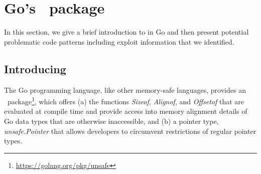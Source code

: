 \section{Go's \unsafe{}~package}
\label{sec:background}

In this section, we give a brief introduction to \unsafe{} in Go and then present potential problematic code patterns including exploit information that we identified.

\subsection{Introducing \unsafe{}}
\label{sec:back:intro}

The Go programming language, like other memory-safe languages, provides an \unsafe{}~package\footnote{\url{https://golang.org/pkg/unsafe}}, which offers 
(a) the functions \textit{Sizeof}, \textit{Alignof}, and \textit{Offsetof} that are evaluated at compile time and provide access into memory alignment details of Go data types that are otherwise inaccessible, %
and (b) a pointer type, \textit{unsafe.Pointer} that allows developers to circumvent restrictions of regular pointer types.

